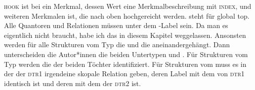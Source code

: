 \textsc{hook} ist bei \citeauthor{CFPS2005a} ein Merkmal, dessen Wert eine Merkmalbeschreibung mit
\textsc{index}, \ltop und weiteren Merkmalen ist, die nach oben hochgereicht werden. \gtop steht für
global top. Alle Quantoren und Relationen müssen unter dem \gtop-Label sein. Da man es eigentlich
nicht braucht, habe ich das in diesem Kapitel weggelassen. Ansonsten werden für alle Strukturen vom
Typ  die \relswe und die \hconswe aneinandergehängt. Dann unterscheiden die Autor*innen
die beiden Untertypen  und . Für Strukturen vom Typ
 werden die \ltopwe der beiden Töchter identifiziert. Für Strukturen
vom  muss es in der \relsl der \textsc{dtr1} irgendeine skopale Relation geben, deren Label mit
dem \ltopw von \textsc{dtr1} identisch ist und deren \argone \qeq mit dem \ltop der \textsc{dtr2}
ist.
\largerpage

